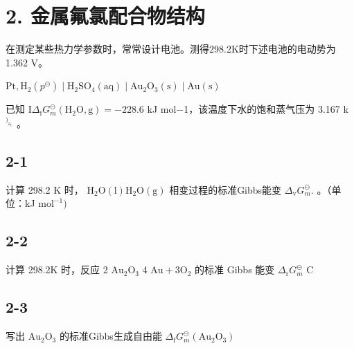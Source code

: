 \section*{2. 金属氟氯配合物结构}
在测定某些热⼒学参数时，常常设计电池。测得298.2K时下述电池的电动势为1.362 V。

$
\mathrm{Pt}, \mathrm{H} _ {2} (p ^ {\ominus}) \mid \mathrm{H} _ {2} \mathrm{SO} _ {4} (\mathrm{aq}) \mid \mathrm{Au} _ {2} \mathrm{O} _ {3} (\mathrm{s}) \mid \mathrm{Au} (\mathrm{s})
$

已知 $\mathrm { I } \Delta _ { \mathrm { f } } G _ { m } ^ { \ominus } ( \mathrm { H } _ { 2 } \mathrm { O } , \mathrm { g } ) = - 2 2 8 . 6$ kJ mol−1，该温度下⽔的饱和蒸⽓压为 3.167 k $^ { \mathrm { { ) } } _ { \mathrm { { a } _ { \mathrm { { c } } } } } }$ 。

\subsection*{2-1}
计算 298.2 K 时， $\mathrm { H _ { 2 } O ( l ) }  \mathrm { H _ { 2 } O ( g ) }$ 相变过程的标准Gibbs能变 $\Delta _ { \mathrm { v } } G _ { m } ^ { \ominus } .$ 。（单位：kJ $\mathrm { m o l ^ { - 1 } } )$

\subsection*{2-2}
计算 298.2K 时，反应 2 $\mathrm { A u _ { 2 } O _ { 3 }  }$ 4 $\mathrm { A u } + 3 \mathrm { O } _ { 2 }$ 的标准 Gibbs 能变 $\Delta _ { \mathrm { { r } } } G _ { m } ^ { \ominus }$ C

\subsection*{2-3}
写出 $\mathrm { { A u _ { 2 } O _ { 3 } } }$ 的标准Gibbs⽣成⾃由能 $\Delta _ { \mathrm { f } } G _ { m } ^ { \ominus } ( \mathrm { A u } _ { 2 } \mathrm { O } _ { 3 } )$
